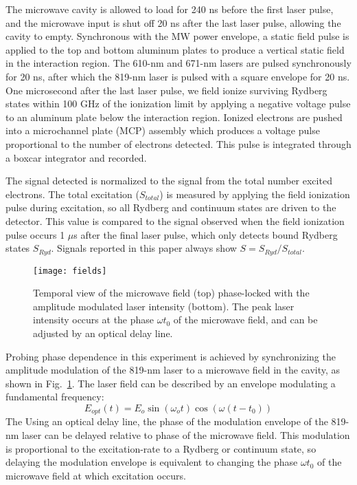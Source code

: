 \documentclass[aps,pra,preprint,groupedaddress]{revtex4-1}
\begin{document}
The microwave cavity is allowed to load for 240 ns before the first laser pulse, and the microwave input is shut off 20 ns after the last laser pulse, allowing the cavity to empty. Synchronous with the MW power envelope, a static field pulse is applied to the top and bottom aluminum plates to produce a vertical static field in the interaction region. The 610-nm and 671-nm lasers are pulsed synchronously for 20 ns, after which the 819-nm laser is pulsed with a square envelope for 20 ns. One microsecond after the last laser pulse, we field ionize surviving Rydberg states within 100 GHz of the ionization limit by applying a negative voltage pulse to an aluminum plate below the interaction region. Ionized electrons are pushed into a microchannel plate (MCP) assembly which produces a voltage pulse proportional to the number of electrons detected. This pulse is integrated through a boxcar integrator and recorded.

The signal detected is normalized to the signal from the total number excited electrons. The total excitation ($S_{total}$) is measured by applying the field ionization pulse during excitation, so all Rydberg and continuum states are driven to the detector. This value is compared to the signal observed when the field ionization pulse occurs 1 $\mu$s after the final laser pulse, which only detects bound Rydberg states $S_{Ryd}$. Signals reported in this paper always show $S = S_{Ryd} / S_{total}$.

\begin{figure}
	\texttt{[image: fields]}
	\caption{Temporal view of the microwave field (top) phase-locked with the amplitude modulated laser intensity (bottom). The peak laser intensity occurs at the phase $\omega t_0$ of the microwave field, and can be adjusted by an optical delay line.}
	\label{fig:AMLaser}
\end{figure}

Probing phase dependence in this experiment is achieved by synchronizing the amplitude modulation of the 819-nm laser to a microwave field in the cavity, as shown in Fig.~\ref{fig:AMLaser}. The laser field can be described by an envelope modulating a fundamental frequency:
\begin{equation}
E_{opt}(t) = E_o \sin{(\omega_o t)} \cos{(\omega(t-t_0))}
\end{equation}
The 
Using an optical delay line, the phase of the modulation envelope of the 819-nm laser can be delayed relative to phase of the microwave field. This modulation is proportional to the excitation-rate to a Rydberg or continuum state, so delaying the modulation envelope is equivalent to changing the phase $\omega t_0$ of the microwave field at which excitation occurs.
\end{document}
